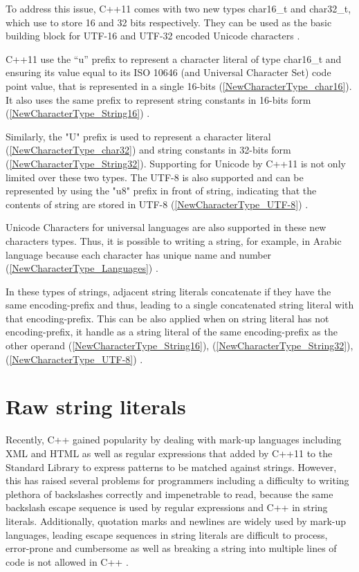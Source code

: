 \documentclass[11pt]{report}
\begin{document}
To address this issue, C++11 comes with two new types char16\_t and char32\_t, which use to store 16 and 32 bits respectively. They can be used as the basic building block for UTF-16 and UTF-32 encoded Unicode characters \cite{Josuttis:2012:CppStandardLibrary}.


C++11 use the “u” prefix to represent a character literal of type char16\_t and ensuring its value equal to its ISO 10646 (and Universal Character Set) code point value, that is represented in a single 16-bits (\ref{NewCharacterType_char16}). It also uses the same prefix to represent string constants in 16-bits form (\ref{NewCharacterType_String16}) \cite{Josuttis2012:CppStandardLibrary}.


Similarly, the "U" prefix is used to represent a character literal (\ref{NewCharacterType_char32}) and string constants in 32-bits form (\ref{NewCharacterType_String32}).  Supporting for Unicode by C++11 is not only limited over these two types. The UTF-8 is also supported and can be represented by using the "u8" prefix in front of string, indicating that the contents of string are stored in UTF-8 (\ref{NewCharacterType_UTF-8}) \cite{Josuttis:2012:CppStandardLibrary}.


Unicode Characters for universal languages are also supported in these new characters types. Thus, it is possible to writing a string, for example, in Arabic language because each character has unique name and number (\ref{NewCharacterType_Languages}) \cite{Josuttis:2012:CppStandardLibrary}.


In these types of strings, adjacent string literals concatenate if they have the same encoding-prefix and thus, leading to a single concatenated string literal with that encoding-prefix. This can be also applied when on string literal has not encoding-prefix, it handle as a string literal of the same encoding-prefix as the other operand (\ref{NewCharacterType_String16}), (\ref{NewCharacterType_String32}), (\ref{NewCharacterType_UTF-8}) \cite{ ISO:2011:Cpplanguage}.


\section{Raw string literals}
\label{section: Raw string literals}
Recently, C++ gained popularity by dealing with mark-up languages including XML and HTML as well as regular expressions that added by C++11 to the Standard Library to express patterns to be matched against strings. However, this has raised several problems for programmers including a difficulty to writing plethora of backslashes correctly and impenetrable to read, because the same backslash escape sequence is used by regular expressions and C++ in string literals. Additionally, quotation marks and newlines are widely used by mark-up languages, leading escape sequences in string literals are difficult to process, error-prone and cumbersome as well as breaking a string into multiple lines of code is not allowed in C++ \cite{ISO:2011:Cpplanguage}.
\end{document}
